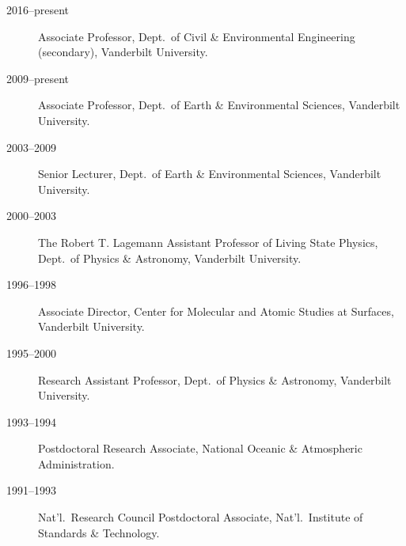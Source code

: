 \begin{description}
\item[2016--present] Associate Professor, Dept.\ of Civil \& Environmental Engineering (secondary), Vanderbilt University.
\item[2009--present] Associate Professor, Dept.\ of Earth \& Environmental Sciences, Vanderbilt University.
\item[2003--2009] Senior Lecturer, Dept.\ of Earth \& Environmental Sciences, Vanderbilt University.
\item[2000--2003] The Robert T. Lagemann Assistant Professor of Living State Physics, Dept.\ of Physics \& Astronomy, Vanderbilt University.
\item[1996--1998] Associate Director, Center for Molecular and Atomic Studies at Surfaces, Vanderbilt University.
\item[1995--2000] Research Assistant Professor, Dept.\ of Physics \& Astronomy, Vanderbilt University.
\item[1993--1994] Postdoctoral Research Associate, National Oceanic \& Atmospheric Administration.
\item[1991--1993] Nat'l.\ Research Council Postdoctoral Associate, Nat'l.\ Institute of Standards \& Technology.
\end{description}
